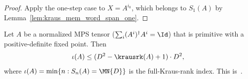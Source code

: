 \begin{proof}
    \leanok
    Apply the one-step case to $X=A^{i_0}$, which belongs to $S_1(A)$ by
    Lemma~\ref{lem:kraus_mem_word_span_one}.
\end{proof}

\begin{theorem}%
    \label{thm:wielandt_general}
    \leanok
    Let $A$ be a normalized MPS tensor ($\sum_i (A^i)^\dagger A^i = \Id$)
    that is primitive with a positive-definite fixed point.
    Then
    \[
        \iota(A) \le
        (D^2 - \krausrk(A) + 1) \cdot D^2,
    \]
    where $\iota(A) = \min\{n : S_n(A) = \MN{D}\}$ is the full-Kraus-rank index.
    This is~\cite[Theorem~1, case~(1)]{Sanz2010Quantum}.
\end{theorem}

